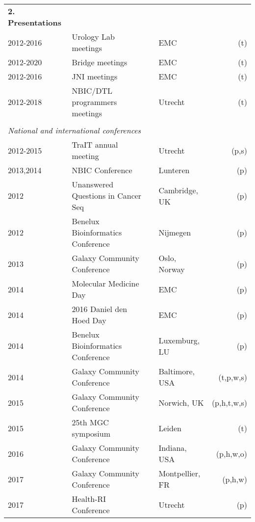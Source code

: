 \begin{table}[h!]
    \begin{tabular}{llp{0.2cm}lr}
        \textbf{2. Presentations} \\
        2012-2016 & Urology Lab meetings              && EMC         & (t) \\
        2012-2020 & Bridge meetings                   && EMC         & (t) \\
        2012-2016 & JNI meetings                      && EMC         & (t) \\
        2012-2018 & NBIC/DTL programmers meetings    && Utrecht     & (t) \\
        \\
        \multicolumn{4}{l}{\textit{National and international conferences}} \\
        2012-2015 & TraIT annual meeting                   && Utrecht         & (p,s) \\
        2013,2014 & NBIC Conference                        && Lunteren        & (p) \\
        2012 & Unanswered Questions in Cancer Seq          && Cambridge, UK   & (p) \\
        2012 & Benelux Bioinformatics Conference           && Nijmegen        & (p) \\
        2013 & Galaxy Community Conference                 && Oslo, Norway    & (p) \\
        2014 & Molecular Medicine Day                      && EMC             & (p) \\
        2014 & 2016 Daniel den Hoed Day                    && EMC             & (p) \\
        2014 & Benelux Bioinformatics Conference           && Luxemburg, LU   & (p) \\
        2014 & Galaxy Community Conference                 && Baltimore, USA  & (t,p,w,s) \\
        2015 & Galaxy Community Conference                 && Norwich, UK     & (p,h,t,w,s) \\
        2015 & 25th MGC symposium                          && Leiden          & (t) \\
        2016 & Galaxy Community Conference                 && Indiana, USA    & (p,h,w,o) \\
        2017 & Galaxy Community Conference                 && Montpellier, FR & (p,h,w) \\
        2017 & Health-RI Conference                        && Utrecht         & (p) \\

\end{tabular}
\end{table}
